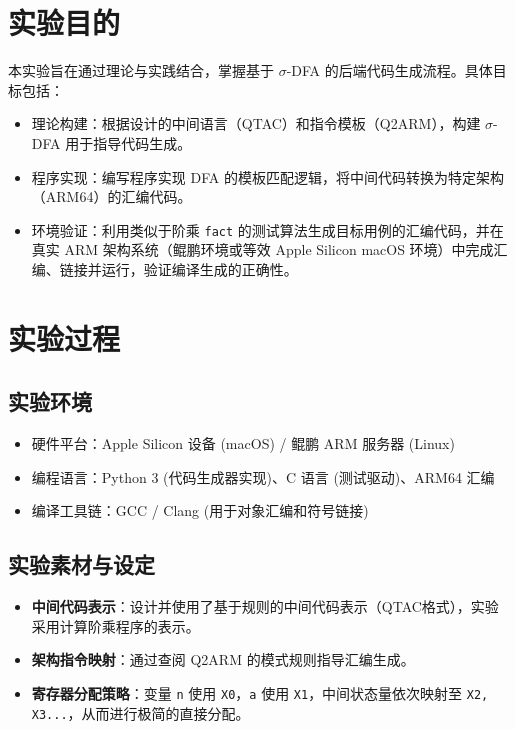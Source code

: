 \documentclass[12pt,a4paper]{ctexart}
\title{\reporttitle}
\author{\authname：\underline{\hspace{3cm}} \quad \authid：\underline{\hspace{3cm}}}
\date{\today}
\begin{document}
\maketitle

\section{实验目的}
本实验旨在通过理论与实践结合，掌握基于 $\sigma$-DFA 的后端代码生成流程。具体目标包括：
\begin{itemize}
  \item 理论构建：根据设计的中间语言（QTAC）和指令模板（Q2ARM），构建 $\sigma$-DFA 用于指导代码生成。
  \item 程序实现：编写程序实现 DFA 的模板匹配逻辑，将中间代码转换为特定架构（ARM64）的汇编代码。
  \item 环境验证：利用类似于阶乘 \texttt{fact} 的测试算法生成目标用例的汇编代码，并在真实 ARM 架构系统（鲲鹏环境或等效 Apple Silicon macOS 环境）中完成汇编、链接并运行，验证编译生成的正确性。
\end{itemize}

\section{实验过程}
\subsection{实验环境}
\begin{itemize}
  \item 硬件平台：Apple Silicon 设备 (macOS) / 鲲鹏 ARM 服务器 (Linux)
  \item 编程语言：Python 3 (代码生成器实现)、C 语言 (测试驱动)、ARM64 汇编
  \item 编译工具链：GCC / Clang (用于对象汇编和符号链接)
\end{itemize}

\subsection{实验素材与设定}
\begin{itemize}
  \item \textbf{中间代码表示}：设计并使用了基于规则的中间代码表示（QTAC格式），实验采用计算阶乘程序的表示。
  \item \textbf{架构指令映射}：通过查阅 Q2ARM 的模式规则指导汇编生成。
  \item \textbf{寄存器分配策略}：变量 \texttt{n} 使用 \texttt{X0}，\texttt{a} 使用 \texttt{X1}，中间状态量依次映射至 \texttt{X2, X3...}，从而进行极简的直接分配。
\end{itemize}
\end{document}

